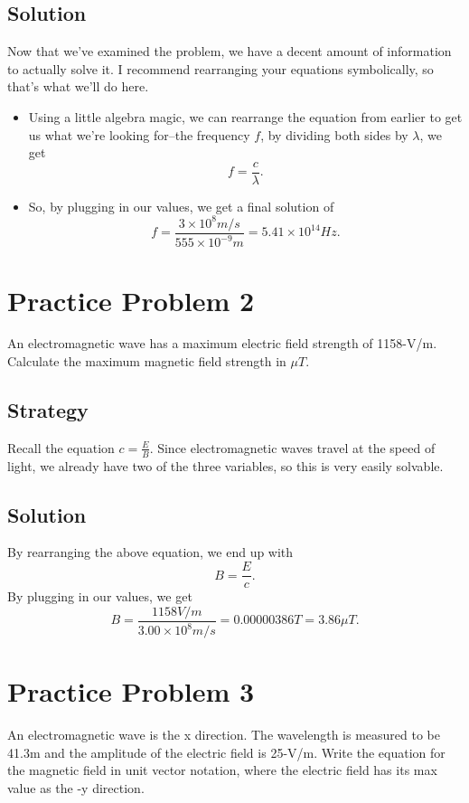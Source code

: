 \documentclass[12pt]{article}
\begin{document}
\subsection*{Solution}
Now that we've examined the problem, we have a decent amount of information to actually solve it. I recommend rearranging your equations symbolically, so that's what we'll do here.
\begin{itemize}
    \item Using a little algebra magic, we can rearrange the equation from earlier to get us what we're looking for--the frequency \(f\), by dividing both sides by \(\lambda\), we get \[f = \frac{c}{\lambda}.\]
    \item So, by plugging in our values, we get a final solution of \[f = \frac{3\times10^{8}m/s}{555\times10^{-9}m} = 5.41\times10^{14}Hz.\]
\end{itemize}

\section*{Practice Problem 2}
An electromagnetic wave has a maximum electric field strength of 1158-V/m. Calculate the maximum magnetic field strength in $\mu T$.

\subsection*{Strategy}
Recall the equation \(c = \frac{E}{B}\). Since electromagnetic waves travel at the speed of light, we already have two of the three variables, so this is very easily solvable.

\subsection*{Solution}
By rearranging the above equation, we end up with \[B = \frac{E}{c}.\] By plugging in our values, we get \[B = \frac{1158V/m}{3.00 \times 10^{8}m/s} = 0.00000386T = 3.86\mu T.\]

\section*{Practice Problem 3}
An electromagnetic wave is the x direction. The wavelength is measured to be 41.3m and the amplitude of the electric field is 25-V/m. Write the equation for the magnetic field in unit vector notation, where the electric field has its max value as the -y direction.
\end{document}
